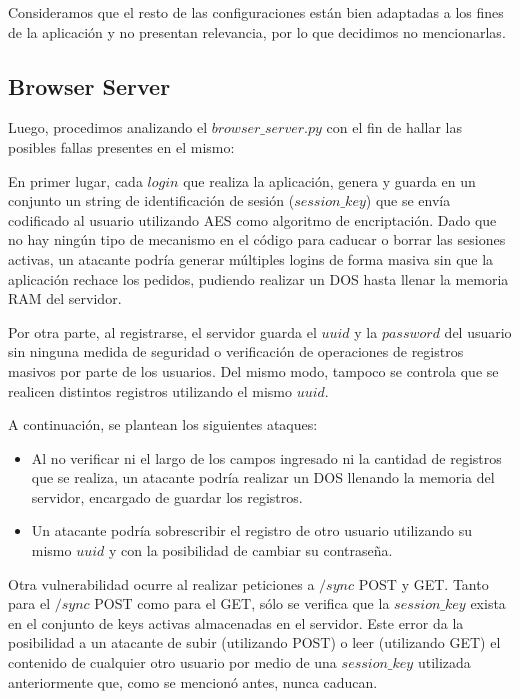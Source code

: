 \documentclass[10pt, a4paper]{article}
\begin{document}
Consideramos que el resto de las configuraciones están bien adaptadas a los fines de la aplicación y no presentan relevancia, por lo que decidimos no mencionarlas.

\newpage
\subsection{Browser Server}
Luego, procedimos analizando el $browser\_server.py$ con el fin de hallar las posibles fallas presentes en el mismo:

En primer lugar, cada $login$ que realiza la aplicación, genera y guarda en un conjunto un string de identificación de sesión ($session\_key$) que se envía codificado al usuario utilizando AES como algoritmo de encriptación. Dado que no hay ningún tipo de mecanismo en el código para caducar o borrar las sesiones activas, un atacante podría generar múltiples logins de forma masiva sin que la aplicación rechace los pedidos, pudiendo realizar un DOS hasta llenar la memoria RAM del servidor.

Por otra parte, al registrarse, el servidor guarda el $uuid$ y la $password$ del usuario sin ninguna medida de seguridad o verificación de operaciones de registros masivos por parte de los usuarios. Del mismo modo, tampoco se controla que se realicen distintos registros utilizando el mismo $uuid$.

A continuación, se plantean los siguientes ataques:
\begin{shaded}
\begin{itemize}
\item Al no verificar ni el largo de los campos ingresado ni la cantidad de registros que se realiza, un atacante podría realizar un DOS llenando la memoria del servidor, encargado de guardar los registros.
\item Un atacante podría sobrescribir el registro de otro usuario utilizando su mismo $uuid$ y con la posibilidad de cambiar su contraseña.
\end{itemize}
\end{shaded}

Otra vulnerabilidad ocurre al realizar peticiones a $/sync$ POST y GET. Tanto para el $/sync$ POST como para el GET, sólo se verifica que la $session\_key$ exista en el conjunto de keys activas almacenadas en el servidor. Este error da la posibilidad a un atacante de subir (utilizando POST) o leer (utilizando GET) el contenido de cualquier otro usuario por medio de una $session\_key$ utilizada anteriormente que, como se mencionó antes, nunca caducan.
\end{document}

